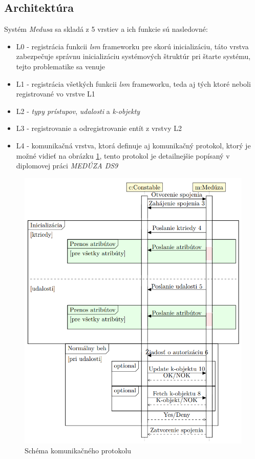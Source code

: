 \subsection{Architektúra}
Systém \textit{Medusa} sa skladá z 5 vrstiev a ich funkcie sú nasledovné:
\begin{itemize}
\item L0 - registrácia funkcii \textit{lsm} frameworku pre skorú inicializáciu, táto vrstva zabezpečuje správnu inicializáciu systémových štruktúr pri štarte systému, tejto problematike sa venuje \cite{medusatim}
\item L1 - registrácia všetkých funkcii \textit{lsm} frameworku, teda aj tých ktoré neboli registrované vo vrstve L1
\item L2 - \textit{typy prístupov}, \textit{udalosti} a \textit{k-objekty}
\item L3 - registrovanie a odregistrovanie entít z vrstvy L2
\item L4 - komunikačná vrstva, ktorá definuje aj komunikačný protokol, ktorý je možné vidieť na obrázku \ref{medusakomunikacia}, tento protokol je detailnejšie popísaný v diplomovej práci \textit{MEDÚZA DS9}\cite{kacer}
\end{itemize}
\begin{figure}[!htbp]
  \centering
  \includegraphics[width=12cm]{img/komunikacia.png}
  \caption{Schéma komunikačného protokolu\cite{kacer}}
  \label{medusakomunikacia}
\end{figure}